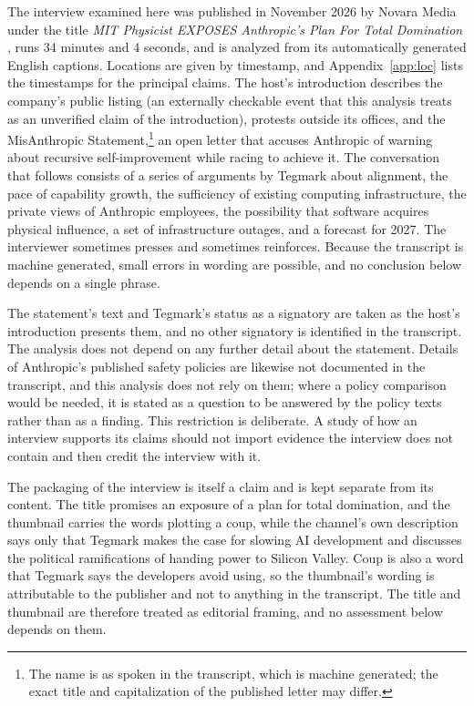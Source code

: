 \documentclass[11pt]{article}
\begin{document}
The interview examined here was published in November 2026 by Novara Media under the title \emph{MIT Physicist EXPOSES Anthropic's Plan For Total Domination} \cite{Novara2026}, runs 34 minutes and 4 seconds, and is analyzed from its automatically generated English captions. Locations are given by timestamp, and Appendix~\ref{app:loc} lists the timestamps for the principal claims. The host's introduction describes the company's public listing (an externally checkable event that this analysis treats as an unverified claim of the introduction), protests outside its offices, and the MisAnthropic Statement,\footnote{The name is as spoken in the transcript, which is machine generated; the exact title and capitalization of the published letter may differ.} an open letter that accuses Anthropic of warning about recursive self-improvement while racing to achieve it. The conversation that follows consists of a series of arguments by Tegmark about alignment, the pace of capability growth, the sufficiency of existing computing infrastructure, the private views of Anthropic employees, the possibility that software acquires physical influence, a set of infrastructure outages, and a forecast for 2027. The interviewer sometimes presses and sometimes reinforces. Because the transcript is machine generated, small errors in wording are possible, and no conclusion below depends on a single phrase.

The statement's text and Tegmark's status as a signatory are taken as the host's introduction presents them, and no other signatory is identified in the transcript. The analysis does not depend on any further detail about the statement. Details of Anthropic's published safety policies are likewise not documented in the transcript, and this analysis does not rely on them; where a policy comparison would be needed, it is stated as a question to be answered by the policy texts rather than as a finding. This restriction is deliberate. A study of how an interview supports its claims should not import evidence the interview does not contain and then credit the interview with it.

The packaging of the interview is itself a claim and is kept separate from its content. The title promises an exposure of a plan for total domination, and the thumbnail carries the words plotting a coup, while the channel's own description says only that Tegmark makes the case for slowing AI development and discusses the political ramifications of handing power to Silicon Valley. Coup is also a word that Tegmark says the developers avoid using, so the thumbnail's wording is attributable to the publisher and not to anything in the transcript. The title and thumbnail are therefore treated as editorial framing, and no assessment below depends on them.
\end{document}
